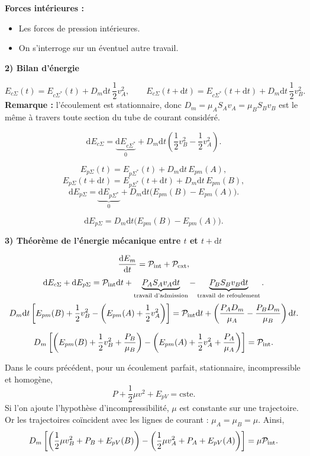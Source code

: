 \documentclass[11pt,a4paper]{article}
\newcommand{\dd}{\mathrm d}
\newcommand{\cste}{\mathrm{cste}}
\newcommand{\sys}{\Sigma^*}
\newcommand{\etape}[1]{\par\medskip\textbf{#1}\par\nopagebreak[4]}
\begin{document}
\par\par\par\medskip\noindent\begin{minipage}{\linewidth}
\textbf{Forces intérieures :}
\begin{itemize}
\item Les forces de pression intérieures.
\item On s'interroge sur un éventuel autre travail.
\end{itemize}
\end{minipage}\par
\etape{2) Bilan d'énergie}
\[E_{c\Sigma}(t)=E_{c\sys}(t)+D_m\dd t\,\frac12v_A^2,\qquad E_{c\Sigma}(t+\dd t)=E_{c\sys}(t+\dd t)+D_m\dd t\,\frac12v_B^2.\]
\textbf{Remarque :} l'écoulement est stationnaire, donc $D_m=\mu_AS_Av_A=\mu_BS_Bv_B$ est le même à travers toute section du tube de courant considéré.
\begin{cadre}\[\dd E_{c\Sigma}=\underbrace{\dd E_{c\sys}}_{0}+D_m\dd t\left(\frac12v_B^2-\frac12v_A^2\right).\]\end{cadre}
\[E_{p\Sigma}(t)=E_{p\sys}(t)+D_m\dd t\,E_{pm}(A),\]
\[E_{p\Sigma}(t+\dd t)=E_{p\sys}(t+\dd t)+D_m\dd t\,E_{pm}(B),\]
\[\dd E_{p\Sigma}=\underbrace{\dd E_{p\sys}}_{0}+D_m\dd t\bigl(E_{pm}(B)-E_{pm}(A)\bigr).\]
\begin{cadre}\[\dd E_{p\Sigma}=D_m\dd t\bigl(E_{pm}(B)-E_{pm}(A)\bigr).\]\end{cadre}
\etape{3) Théorème de l'énergie mécanique entre $t$ et $t+\dd t$}
\[\frac{\dd E_m}{\dd t}=\Piint+\Piext,\]
\[\dd E_{c\Sigma}+\dd E_{p\Sigma}=\Piint\dd t+\underbrace{P_AS_Av_A\dd t}_{\text{travail d'admission}}-\underbrace{P_BS_Bv_B\dd t}_{\text{travail de refoulement}}.\]
\[
D_m\dd t\left[E_{pm}(B)+\frac12v_B^2-\left(E_{pm}(A)+\frac12v_A^2\right)\right]=\Piint\dd t+\left(\frac{P_AD_m}{\mu_A}-\frac{P_BD_m}{\mu_B}\right)\dd t.
\]
\begin{cadre}\[D_m\left[\left(E_{pm}(B)+\frac12v_B^2+\frac{P_B}{\mu_B}\right)-\left(E_{pm}(A)+\frac12v_A^2+\frac{P_A}{\mu_A}\right)\right]=\mathcal P_{\mathrm{int}}.\]\end{cadre}
Dans le cours précédent, pour un écoulement parfait, stationnaire, incompressible et homogène,
\[P+\frac12\mu v^2+E_{pV}=\cste.\]
Si l'on ajoute l'hypothèse d'incompressibilité, $\mu$ est constante sur une trajectoire. Or les trajectoires coïncident avec les lignes de courant : $\mu_A=\mu_B=\mu$. Ainsi,
\[D_m\left[\left(\frac12\mu v_B^2+P_B+E_{pV}(B)\right)-\left(\frac12\mu v_A^2+P_A+E_{pV}(A)\right)\right]=\mu\mathcal P_{\mathrm{int}}.\]
\end{document}
